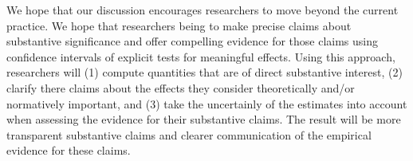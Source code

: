\documentclass[12pt]{article}
\begin{document}
We hope that our discussion encourages researchers to move beyond the current practice. We hope that researchers being to make precise claims about substantive significance and offer compelling evidence for those claims using confidence intervals of explicit tests for meaningful effects. Using this approach, researchers will (1) compute quantities that are of direct substantive interest, (2) clarify there claims about the effects they consider theoretically and/or normatively important, and (3) take the uncertainly of the estimates into account when assessing the evidence for their substantive claims. The result will be more transparent substantive claims and clearer communication of the empirical evidence for these claims.

%
%
\end{document}
